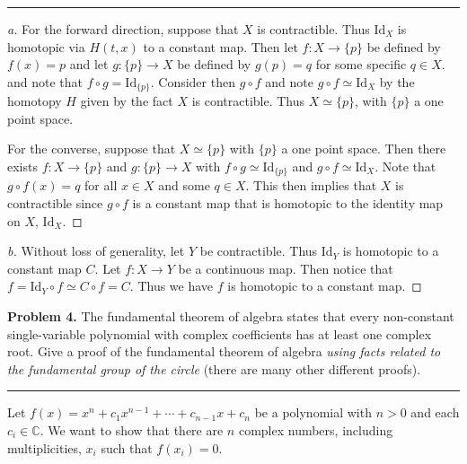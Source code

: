 \documentclass[leqno]{article}
\theoremstyle{nonumberplain}
\newtheorem{proof}{Proof}
\begin{document}
\noindent\rule[0.5ex]{\linewidth}{1pt}

\begin{proof}[a]
For the forward direction, suppose that $X$ is contractible.  Thus $\mathrm{Id}_X$ is homotopic via $H(t,x)$ to a constant map. Then let $f\colon X \to \{p\}$ be defined by $f(x)=p$ and let $g \colon \{p\} \to X$ be defined by $g(p)=q$ for some specific $q\in X$. and note that $f \circ g = \mathrm{Id}_{\{p\}}$. Consider then $g\circ f$ and note $g\circ f \simeq \mathrm{Id}_{X}$ by the homotopy $H$ given by the fact $X$ is contractible.  Thus $X\simeq \{p\}$, with $\{p\}$ a one point space.

For the converse, suppose that $X\simeq \{p\}$ with $\{p\}$ a one point space.  Then there exists $f \colon X \to \{p\}$ and $g\colon \{p\} \to X$ with $f\circ g \simeq \mathrm{Id}_{\{p\}}$ and $g\circ f \simeq \mathrm{Id}_X$.  Note that $g\circ f(x)=q$ for all $x\in X$ and some $q\in X$.  This then implies that $X$ is contractible since $g\circ f$ is a constant map that is homotopic to the identity map on $X$, $\mathrm{Id}_X$.
\end{proof}

\begin{proof}[b]
Without loss of generality, let $Y$ be contractible.  Thus $\mathrm{Id}_Y$ is homotopic to a constant map $C$.  Let $f \colon X \to Y$ be a continuous map.  Then notice that $f=\mathrm{Id}_{Y}\circ f \simeq C \circ f=C$.  Thus we have $f$ is homotopic to a constant map.
\end{proof}


\pagebreak





\noindent\textbf{Problem 4.} The fundamental theorem of algebra states that every non-constant single-variable polynomial with complex coefficients has at least one complex root. Give a proof of the fundamental theorem of algebra \emph{using facts related to the fundamental group of the circle} (there are many other different proofs).

\noindent\rule[0.5ex]{\linewidth}{1pt}


Let $f(x)=x^n +c_1x^{n-1}+\cdots + c_{n-1} x+c_n$ be a polynomial with $n>0$ and each $c_i\in \mathbb{C}$. We want to show that there are $n$ complex numbers, including multiplicities, $x_i$ such that $f(x_i)=0$. 
\end{document}
